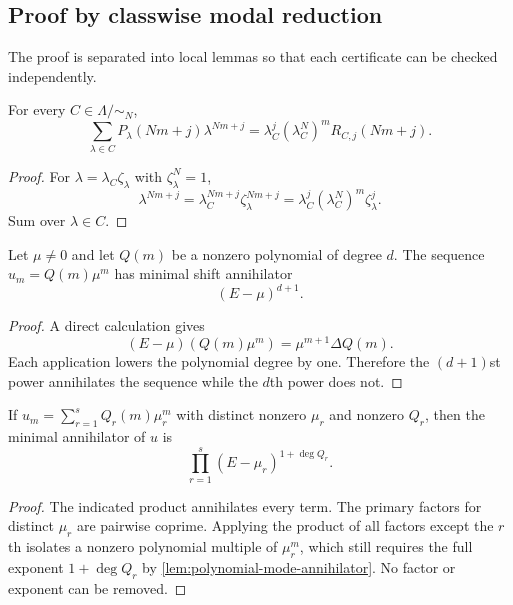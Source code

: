 \documentclass[11pt]{article}
\theoremstyle{definition}\newtheorem{definition}[theorem]{Definition}\newtheorem{example}[theorem]{Example}\newtheorem{construction}[theorem]{Construction}\newtheorem{algorithm}[theorem]{Algorithm}\newtheorem{conjecture}[theorem]{Conjecture}\newtheorem{problem}[theorem]{Problem}
\theoremstyle{remark}\newtheorem{remark}[theorem]{Remark}\newtheorem{boundary}[theorem]{Boundary}\newtheorem{certificate}[theorem]{Computational Certificate}\newtheorem{classical}[theorem]{Classical Input}\newtheorem{principle}[theorem]{Structural Principle}
\begin{document}
\subsection{Proof by classwise modal reduction}
The proof is separated into local lemmas so that each certificate can be checked independently.

\begin{lemma}
\label{lem:classwise-transfer}
For every $C\in\Lambda/{\sim_N}$,
\[
 \sum_{\lambda\in C}P_\lambda(Nm+j)\lambda^{Nm+j}
 =
 \lambda_C^j(\lambda_C^N)^mR_{C,j}(Nm+j).
\]
\end{lemma}

\begin{proof}
For $\lambda=\lambda_C\zeta_\lambda$ with $\zeta_\lambda^N=1$,
\[
 \lambda^{Nm+j}
 =\lambda_C^{Nm+j}\zeta_\lambda^{Nm+j}
 =\lambda_C^j(\lambda_C^N)^m\zeta_\lambda^j.
\]
Sum over $\lambda\in C$.
\end{proof}

\begin{lemma}
\label{lem:polynomial-mode-annihilator}
Let $\mu\neq0$ and let $Q(m)$ be a nonzero polynomial of degree $d$.  The sequence $u_m=Q(m)\mu^m$ has minimal shift annihilator
\[
 (E-\mu)^{d+1}.
\]
\end{lemma}

\begin{proof}
A direct calculation gives
\[
 (E-\mu)(Q(m)\mu^m)=\mu^{m+1}\Delta Q(m).
\]
Each application lowers the polynomial degree by one.  Therefore the $(d+1)$st power annihilates the sequence while the $d$th power does not.
\end{proof}

\begin{lemma}
\label{lem:coprime-modal-synthesis}
If $u_m=\sum_{r=1}^sQ_r(m)\mu_r^m$ with distinct nonzero $\mu_r$ and nonzero $Q_r$, then the minimal annihilator of $u$ is
\[
 \prod_{r=1}^s(E-\mu_r)^{1+\deg Q_r}.
\]
\end{lemma}

\begin{proof}
The indicated product annihilates every term.  The primary factors for distinct $\mu_r$ are pairwise coprime.  Applying the product of all factors except the $r$th isolates a nonzero polynomial multiple of $\mu_r^m$, which still requires the full exponent $1+\deg Q_r$ by \cref{lem:polynomial-mode-annihilator}.  No factor or exponent can be removed.
\end{proof}
\end{document}
